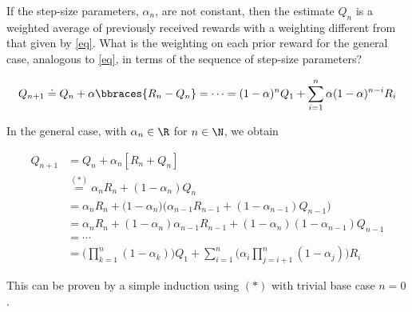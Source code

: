\begin{exercise}
If the step-size parameters, $\alpha_n$, are not constant, then the estimate $Q_n$ is a weighted average of previously received rewards with a weighting different from that given by \eqref{eq}.
What is the weighting on each prior reward for the general case, analogous to \eqref{eq}, in terms of the sequence of step-size parameters?

\begin{align} \label{eq}
    Q_{n+1}
    \doteq
    Q_n + \alpha \bbraces{R_n - Q_n}
    = \cdots =
    (1 - \alpha)^n Q_1
    +
    \sum_{i=1}^n
        \alpha (1 - \alpha)^{n-i} R_i
\end{align}
\end{exercise}

\begin{solution}
In the general case, with $\alpha_n \in \R$ for $n \in \N$, we obtain

\begin{align*}
  Q_{n+1}
  &=
  Q_n + \alpha_n [R_n + Q_n] \\
  &\stackrel{(*)}{=}
  \alpha_n R_n + (1 - \alpha_n) Q_n \\
  &=
  \alpha_n R_n + \big(
  1 - \alpha_n
  \big)\big(
  \alpha_{n-1}R_{n-1} + (1-\alpha_{n-1})Q_{n-1}
  \big) \\
  &=
  \alpha_n R_n + (1 - \alpha_n)\alpha_{n-1}R_{n-1}
  +
  (1-\alpha_n)(1-\alpha_{n-1})Q_{n-1} \\
  &= \cdots \\
  &=
  \bigg(\prod_{k=1}^n(1-\alpha_k)\bigg)Q_1
  +
  \sum_{i = 1}^n \bigg(\alpha_i  \prod_{j = i+1}^n(1-\alpha_j)\bigg) R_i
\end{align*}

This can be proven by a simple induction using $(*)$ with trivial base case $n = 0$.
\end{solution}
